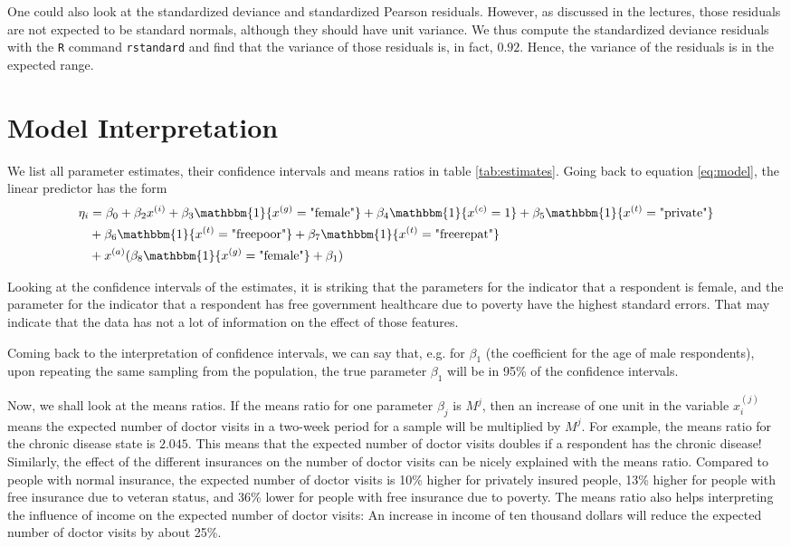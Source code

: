 \documentclass[a4paper,11pt]{article}
\begin{document}
One could also look at the standardized deviance and standardized Pearson residuals. However, as discussed in the lectures, those residuals are not expected to be standard normals, although they should have unit variance. We thus compute the standardized deviance residuals with the \texttt{R} command \texttt{rstandard} and find that the variance of those residuals is, in fact, $0.92$. Hence, the variance of the residuals is in the expected range.

\section{Model Interpretation}

We list all parameter estimates, their confidence intervals and means ratios in table \ref{tab:estimates}. Going back to equation \ref{eq:model}, the linear predictor has the form
\begin{align}
\eta_i &= \beta_0  +  \beta_2 x^{(i)} + \beta_3 \mathbbm{1}\{x^{(g)} = \text{"female"}\}     +\beta_4\mathbbm{1}\{x^{(c)} = 1\}   + 
 \beta_5\mathbbm{1}\{x^{(t)} = \text{"private"}\}    \nonumber\\
 &+  \beta_6\mathbbm{1}\{x^{(t)} = \text{"freepoor"}\}  + \beta_7 \mathbbm{1}\{x^{(t)} = \text{"freerepat"}\}  \\
&+   x^{(a)}(\beta_8 \mathbbm{1}\{x^{(g)} = \text{"female"} \} + \beta_1) \nonumber
\end{align}



Looking at the confidence intervals of the estimates, it is striking that the parameters for the indicator that a respondent is female, and the parameter for the indicator that a respondent has free government healthcare due to poverty have the highest standard errors. That may indicate that the data has not a lot of information on the effect of those features.

Coming back to the interpretation of confidence intervals, we can say that, e.g. for $\beta_1$ (the coefficient for the age of male respondents), upon repeating the same sampling from the population, the true parameter $\beta_1$ will be in 95\% of the confidence intervals.

Now, we shall look at the means ratios. If the means ratio for one parameter $\beta_j$ is $M^j$, then an increase of one unit in the variable $x_i^{(j)}$ means the expected number of doctor visits in a two-week period for a sample will be multiplied by  $M^j$. For example, the means ratio for the chronic disease state is $2.045$. This means that the expected number of doctor visits doubles if a respondent has the chronic disease! Similarly, the effect of the different insurances on the number of doctor visits can be nicely explained with the means ratio. Compared to people with normal insurance, the expected number of doctor visits is 10\% higher for privately insured people, 13\% higher for people with free insurance due to veteran status, and 36\% lower for people with free insurance due to poverty. The means ratio also helps interpreting the influence of income on the expected number of doctor visits: An increase in income of ten thousand dollars will reduce the expected number of doctor visits by about 25\%.
\end{document}

